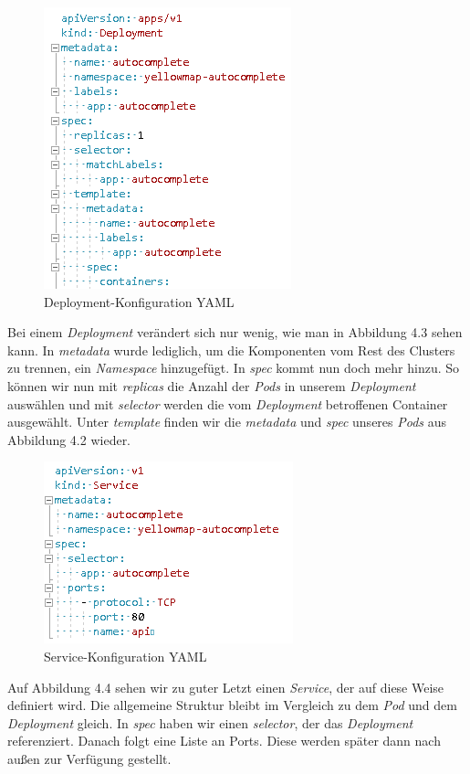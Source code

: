 \documentclass[12pt,a4paper]{scrartcl}
\begin{document}
\begin{figure}[h!]
	\centering
	\includegraphics[scale=1]{KubeYmlDep.png}
	\caption[Screenshot]{Deployment-Konfiguration YAML}
\end{figure}

Bei einem \emph{Deployment} verändert sich nur wenig, wie man in Abbildung 4.3 sehen kann. In \emph{metadata} wurde lediglich, um die Komponenten vom Rest des Clusters zu trennen, ein \emph{Namespace} hinzugefügt. In \emph{spec} kommt nun doch mehr hinzu. So können wir nun mit \emph{replicas} die Anzahl der \emph{Pods} in unserem \emph{Deployment} auswählen und mit \emph{selector} werden die vom \emph{Deployment} betroffenen Container ausgewählt. Unter \emph{template} finden wir die \emph{metadata} und \emph{spec} unseres \emph{Pods} aus Abbildung 4.2 wieder.

\begin{figure}[h!]
	\centering
	\includegraphics[scale=1]{KubeYmlSvc.png}
	\caption[Screenshot]{Service-Konfiguration YAML}
\end{figure}

Auf Abbildung 4.4 sehen wir zu guter Letzt einen \emph{Service}, der auf diese Weise definiert wird. Die allgemeine Struktur bleibt im Vergleich zu dem \emph{Pod} und dem \emph{Deployment} gleich. In \emph{spec} haben wir einen \emph{selector}, der das \emph{Deployment} referenziert. Danach folgt eine Liste an Ports. Diese werden später dann nach außen zur Verfügung gestellt.
\end{document}

